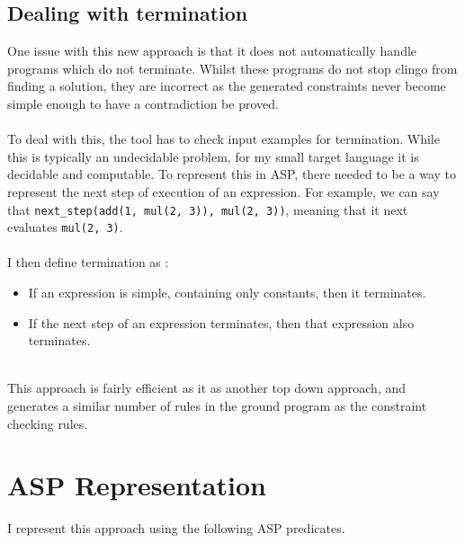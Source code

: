 \subsection{Dealing with termination}
One issue with this new approach is that it does not automatically handle programs which do not terminate. Whilst these programs do not stop clingo from finding a solution, they are incorrect as the generated constraints never become simple enough to have a contradiction be proved. \\ \\
To deal with this, the tool has to check input examples for termination. While this is typically an undecidable problem, for my small target language it is decidable and computable. To represent this in ASP, there needed to be a way to represent the next step of execution of an expression. For example, we can say that \lstinline!next_step(add(1, mul(2, 3)), mul(2, 3))!, meaning that it next evaluates \lstinline!mul(2, 3)!. \\ \\
I then define termination as :
\begin{itemize}
\item If an expression is simple, containing only constants, then it terminates.
\item If the next step of an expression terminates, then that expression also terminates.
\end{itemize}
\mbox{}\\
This approach is fairly efficient as it as another top down approach, and generates a similar number of rules in the ground program as the constraint checking rules.
\mbox{}\\
\section{ASP Representation}
I represent this approach using the following ASP predicates.

